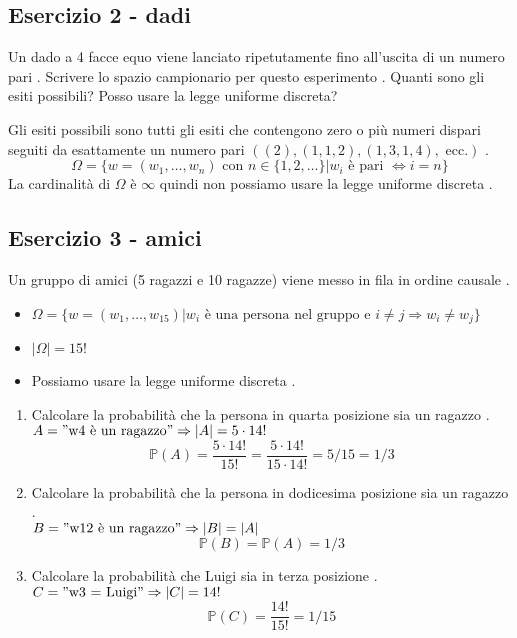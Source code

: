 \documentclass[12pt,a4paper, openany]{book}
\begin{document}
	\subsection*{Esercizio 2 - dadi }
	Un dado a 4 facce equo viene lanciato ripetutamente fino all'uscita di un numero pari . Scrivere lo spazio campionario per questo esperimento . Quanti sono gli esiti possibili? Posso usare la legge uniforme discreta? 
	
	Gli esiti possibili sono tutti gli esiti che contengono zero o più numeri dispari seguiti da esattamente un numero pari $((2), (1, 1, 2), (1, 3, 1, 4), \text{ ecc.})$ .
	$$ \Omega = \{w = (w_1, \dots, w_n) \text{ con } n \in \{1, 2, \dots\} | w_i \text{ è pari } \Leftrightarrow i = n\} $$ 
	La cardinalità di $\Omega$ è $\infty$  quindi non possiamo usare la legge uniforme discreta .
	
	\subsection*{Esercizio 3 - amici }
	Un gruppo di amici (5 ragazzi e 10 ragazze) viene messo in fila in ordine causale .
	\begin{itemize}
		\item $\Omega = \{w = (w_1, \dots, w_{15}) | w_i \text{ è una persona nel gruppo e } i \neq j \Rightarrow w_i \neq w_j\}$ 
		\item $|\Omega| = 15!$ 
		\item Possiamo usare la legge uniforme discreta .
	\end{itemize}
	\begin{enumerate}
		\item Calcolare la probabilità che la persona in quarta posizione sia un ragazzo . \\
		$A = "\text{w4 è un ragazzo}" \Rightarrow |A| = 5 \cdot 14!$ 
		$$ \mathbb{P}(A) = \frac{5 \cdot 14!}{15!} = \frac{5 \cdot 14!}{15 \cdot 14!} = 5/15 = 1/3 $$ 
		\item Calcolare la probabilità che la persona in dodicesima posizione sia un ragazzo . \\
		$B = "\text{w12 è un ragazzo}" \Rightarrow |B| = |A|$ 
		$$ \mathbb{P}(B) = \mathbb{P}(A) = 1/3 $$ 
		\item Calcolare la probabilità che Luigi sia in terza posizione . \\
		$C = "\text{w3 = Luigi}" \Rightarrow |C| = 14!$ 
		$$ \mathbb{P}(C) = \frac{14!}{15!} = 1/15 $$ 
	\end{enumerate}
	
\end{document}
